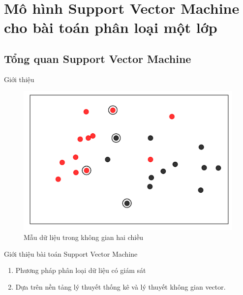 \documentclass[
	10pt,                %
	aspectratio=169,     %
]{beamer}
\begin{document}
        
\section{Mô hình Support Vector Machine cho bài toán phân loại một lớp}
\subsection{Tổng quan Support Vector Machine}
	\begin{frame}{Giới thiệu}
	    \begin{figure}[h!]
			\includegraphics[scale=0.5]{figures/ssvm1.png}
			\caption{Mẫu dữ liệu trong không gian hai chiều}
		\end{figure}
		\begin{block}{Giới thiệu bài toán Support Vector Machine}
    	\begin{enumerate}
    		\item Phương pháp phân loại dữ liệu có giám sát
    		\item Dựa trên nền tảng lý thuyết thống kê và lý thuyết không gian vector.
    	\end{enumerate}
        \end{block}
	\end{frame}
	
\end{document}
